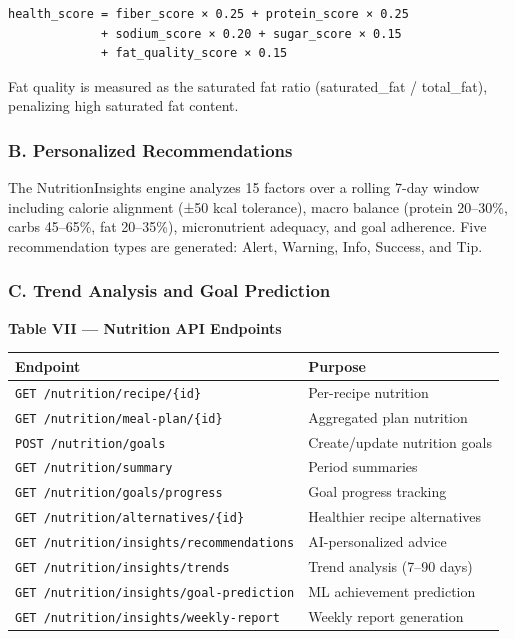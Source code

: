\documentclass[
  10pt,
]{article}
\begin{document}
\begin{verbatim}
health_score = fiber_score × 0.25 + protein_score × 0.25
             + sodium_score × 0.20 + sugar_score × 0.15
             + fat_quality_score × 0.15
\end{verbatim}

Fat quality is measured as the saturated fat ratio (saturated\_fat /
total\_fat), penalizing high saturated fat content.

\subsubsection{B. Personalized
Recommendations}\label{b.-personalized-recommendations}

The NutritionInsights engine analyzes 15 factors over a rolling 7-day
window including calorie alignment (±50 kcal tolerance), macro balance
(protein 20--30\%, carbs 45--65\%, fat 20--35\%), micronutrient
adequacy, and goal adherence. Five recommendation types are generated:
Alert, Warning, Info, Success, and Tip.

\subsubsection{C. Trend Analysis and Goal
Prediction}\label{c.-trend-analysis-and-goal-prediction}

\textbf{Table VII --- Nutrition API Endpoints}

\begin{longtable}[]{@{}
  >{\raggedright\arraybackslash}p{}
  >{\raggedright\arraybackslash}p{}@{}}
\toprule\noalign{}
\begin{minipage}[b]{\linewidth}\raggedright
Endpoint
\end{minipage} & \begin{minipage}[b]{\linewidth}\raggedright
Purpose
\end{minipage} \\
\midrule\noalign{}
\endhead
\bottomrule\noalign{}
\endlastfoot
\texttt{GET\ /nutrition/recipe/\{id\}} & Per-recipe nutrition \\
\texttt{GET\ /nutrition/meal-plan/\{id\}} & Aggregated plan nutrition \\
\texttt{POST\ /nutrition/goals} & Create/update nutrition goals \\
\texttt{GET\ /nutrition/summary} & Period summaries \\
\texttt{GET\ /nutrition/goals/progress} & Goal progress tracking \\
\texttt{GET\ /nutrition/alternatives/\{id\}} & Healthier recipe
alternatives \\
\texttt{GET\ /nutrition/insights/recommendations} & AI-personalized
advice \\
\texttt{GET\ /nutrition/insights/trends} & Trend analysis (7--90
days) \\
\texttt{GET\ /nutrition/insights/goal-prediction} & ML achievement
prediction \\
\texttt{GET\ /nutrition/insights/weekly-report} & Weekly report
generation \\
\end{longtable}
\end{document}
